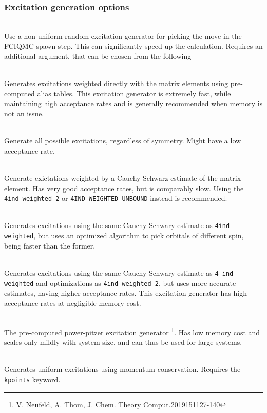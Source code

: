 \documentclass[a4paper,notitlepage]{scrreprt}
\newcommand\codeitem[1]{\needspace{1.5\baselineskip}\item[\textnormal{\ttfamily #1 \nopagebreak}] \hfill \\ \nopagebreak}
\begin{document}
\subsubsection{Excitation generation options}
\begin{description}
  \codeitem{\textcolor{oblue}{nonUniformRandExcits}}
  Use a non-uniform random excitation generator for picking the move in the
  FCIQMC spawn step. This can significantly speed up the calculation. Requires an additional
  argument, that can be chosen from the following
  \begin{description}
   \codeitem{\textcolor{oblue}{pchb}}
    Generates excitations weighted directly with the matrix elements using pre-computed
    alias tables. This excitation generator is extremely fast, while
    maintaining high acceptance rates and is generally recommended when
    memory is not an issue.    
    \codeitem{nosymgen}
    Generate all possible excitations, regardless of symmetry. Might have a
    low acceptance rate.
    \codeitem{4ind-weighted}
    Generate exictations weighted by a Cauchy-Schwarz estimate of the matrix
    element. Has very good acceptance rates, but is comparably slow. Using the
    \texttt{4ind-weighted-2} or \texttt{4IND-WEIGHTED-UNBOUND} instead is recommended.
    \codeitem{4ind-weighted-2}
    Generates excitations using the same Cauchy-Schwary estimate as
    \texttt{4ind-weighted}, but uses an optimized algorithm to pick orbitals
    of different spin, being faster than the former.
    \codeitem{4ind-weighted-unbound}
    Generates excitations using the same Cauchy-Schwary estimate as
    \texttt{4-ind-weighted} and optimizations as \texttt{4ind-weighted-2}, but
    uses more accurate estimates, having higher acceptance rates. This
    excitation generator has high acceptance rates at negligible memory cost.
    \codeitem{pcpp}
    The pre-computed power-pitzer excitation generator \footnote{V. Neufeld,
      A. Thom, J. Chem. Theory Comput.2019151127-140}. Has low memory cost and
    scales only mildly with system size, and can thus be used for large systems.
  \end{description}
  \codeitem{lattice-excitgen}
  Generates uniform excitations using momentum conservation. Requires the
  \texttt{kpoints} keyword.
\end{description}
  
\end{document}
